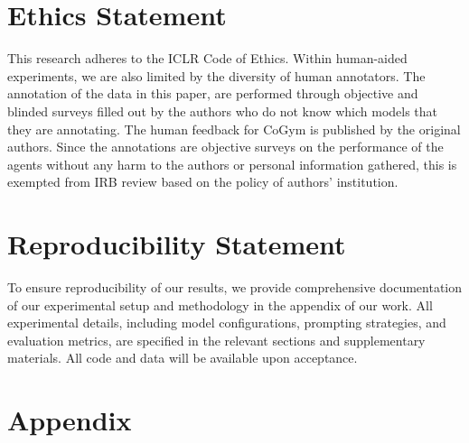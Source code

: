 \documentclass{article} %
\begin{document}
	\section*{Ethics Statement}
	This research adheres to the ICLR Code of Ethics.
    Within human-aided experiments,
	we are also limited by the diversity of human annotators. The annotation of the data in this paper,
    are performed through objective and blinded surveys filled out by the authors
    who do not know which models that they are annotating.
    The human feedback for CoGym \citep{shao2024collaborative}
    is published by the original authors.
    Since the annotations are objective surveys on the performance of the agents
    without any harm to the authors or personal information gathered, this is exempted from IRB review based on the policy
    of authors' institution.
    \section*{Reproducibility Statement}
To ensure reproducibility of our results, we provide comprehensive documentation of our experimental setup and methodology in the appendix of our work. All experimental details, including
model configurations, prompting strategies, and evaluation metrics, are specified in the relevant sections and supplementary materials. All code and data will be available upon acceptance. 



	



	\newpage
	\appendix
	\section*{Appendix}
	
\end{document}
